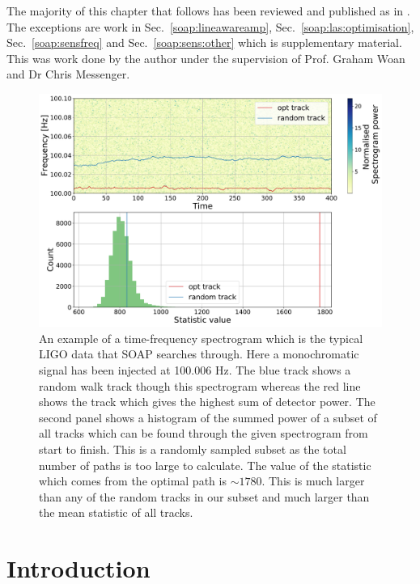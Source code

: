 The majority of this chapter that follows has been reviewed and published as in
\citep{bayley2019GeneralizedApplication}.  The
exceptions are work in Sec.~\ref{soap:lineawareamp},
Sec.~\ref{soap:las:optimisation}, Sec.~\ref{soap:sensfreq} and
Sec.~\ref{soap:sens:other} which is supplementary material.
This was work done by the author
under the supervision of Prof. Graham Woan and Dr Chris Messenger.


\begin{figure}[ht]

\centering
\includegraphics[width=\linewidth]{C3_soap/soap_spect_motivation.pdf}
\caption[Example of frequency tracks through a spectrogram and their summed power.]{An example of a time-frequency spectrogram which is the typical \gls{LIGO} data that SOAP searches through. Here a monochromatic signal has been injected at 100.006 Hz. The blue track shows a random walk track though this spectrogram whereas the red line shows the track which gives the highest sum of detector power. The second panel shows a histogram of the summed power of a subset of all tracks which can be found through the given spectrogram from start to finish. This is a randomly sampled subset as the total number of paths is too large to calculate. The value of the statistic which comes from the optimal path is $\sim1780$. This is much larger than any of the random tracks in our subset and much larger than the mean statistic of all tracks. }
\label{soap:motivation:plot}

\end{figure}

\section{Introduction}

